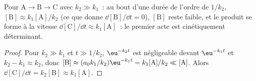 \begin{proposition}\label{prop:b1:elementary-steps:qssa-justified}
Pour $\mathrm{A} \to \mathrm{B} \to \mathrm{C}$ avec $k_2 \gg k_1$~: au
bout d'une durée de l'ordre de $1/k_2$, $[\mathrm{B}] \approx k_1[\mathrm{A}]/k_2$
(ce que donne $\dd[\mathrm{B}]/\dd t = 0$), $[\mathrm{B}]$ reste faible,
et le produit se forme à la vitesse $\dd[\mathrm{C}]/\dd t \approx k_1[\mathrm{A}]$~:
le premier acte est cinétiquement déterminant.
\end{proposition}

\begin{proof}
Pour $k_2 \gg k_1$ et $t \gg 1/k_2$, $\eu^{-k_2t}$ est négligeable
devant
$\eu^{-k_1t}$ et $k_2 - k_1 \approx k_2$, donc $[\mathrm{B}] \approx (a_0k_1/k_2)
\eu^{-k_1t} = k_1[\mathrm{A}]/k_2 \ll [\mathrm{A}]$. Alors
$\dd[\mathrm{C}]/\dd t = k_2[\mathrm{B}] \approx k_1[\mathrm{A}]$.
\end{proof}

